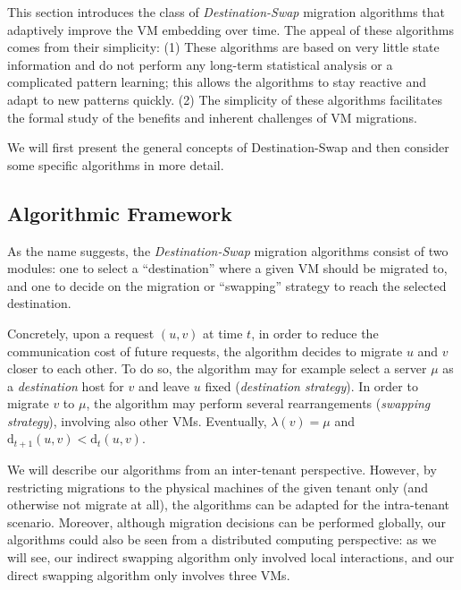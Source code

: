 \documentclass[conference]{IEEEtran}
\newcommand{\dist}{\text{d}}
\newcommand{\cancel}[1]{}
\begin{document}
This section introduces the class of \emph{Destination-Swap} migration algorithms that adaptively improve
the VM embedding over time. The appeal of these algorithms comes from their simplicity: (1) These algorithms are based on very little
state information and do not perform any long-term statistical analysis or a complicated pattern learning; this allows the algorithms to stay reactive and
adapt to new patterns quickly. (2) The simplicity of these algorithms facilitates the formal study of the benefits and inherent challenges of
VM migrations.

We will first present the general concepts of Destination-Swap and then consider some specific algorithms in more detail.

\cancel{
The first algorithm we denote as {\sc MeetMiddle} is very simple, Upon a communication request $(u,v)$ perform local swaps (migrations) between $u$ and one of it's neighbors on the shortest path to $v$ (select that neighbor randomly with uniform distribution). make the same operation for $v$. These swaps are performed until $u$ and $v$ are neighbors.}

\subsection{Algorithmic Framework}

As the name suggests, the \emph{Destination-Swap} migration algorithms
consist of two modules: one to select a ``destination'' where a given VM should be migrated to,
and one to decide on the migration or ``swapping'' strategy to reach the selected destination.

Concretely, upon a request $(u,v)$ at time $t$,  in order to reduce the communication cost of future requests,
the algorithm decides to migrate $u$ and $v$ closer to each other. To do so, the algorithm may for example select a server $\mu$ as a \emph{destination} host for $v$ and leave $u$ fixed (\emph{destination strategy}). In order to migrate $v$ to $\mu$, the algorithm may perform several rearrangements (\emph{swapping strategy}), involving also other VMs. Eventually, $\lambda(v) = \mu$ and $\dist_{t+1}(u,v) < \dist_t(u,v)$.

We will describe our algorithms from an inter-tenant perspective. However, by restricting migrations to the physical machines of the given tenant only (and otherwise not migrate at all), the algorithms can be adapted for the intra-tenant scenario. Moreover, although migration decisions can be performed globally, our algorithms
could also be seen from a distributed computing perspective: as we will see, our indirect swapping algorithm only involved local interactions, and our direct
swapping algorithm only involves three VMs.
\end{document}
